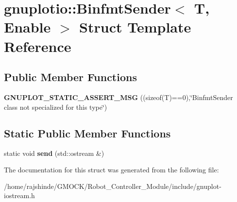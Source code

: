 \hypertarget{structgnuplotio_1_1_binfmt_sender}{}\section{gnuplotio\+:\+:Binfmt\+Sender$<$ T, Enable $>$ Struct Template Reference}
\label{structgnuplotio_1_1_binfmt_sender}
\subsection*{Public Member Functions}
\begin{DoxyCompactItemize}
\item 
{\bfseries G\+N\+U\+P\+L\+O\+T\+\_\+\+S\+T\+A\+T\+I\+C\+\_\+\+A\+S\+S\+E\+R\+T\+\_\+\+M\+SG} ((sizeof(T)==0),\char`\"{}Binfmt\+Sender class not specialized for this type\char`\"{})\hypertarget{structgnuplotio_1_1_binfmt_sender_ab0b554a2e81309917b2fa6f480e2a8e2}{}\label{structgnuplotio_1_1_binfmt_sender_ab0b554a2e81309917b2fa6f480e2a8e2}

\end{DoxyCompactItemize}
\subsection*{Static Public Member Functions}
\begin{DoxyCompactItemize}
\item 
static void {\bfseries send} (std\+::ostream \&)\hypertarget{structgnuplotio_1_1_binfmt_sender_a762010e3172c02e981252f93185b29c8}{}\label{structgnuplotio_1_1_binfmt_sender_a762010e3172c02e981252f93185b29c8}

\end{DoxyCompactItemize}


The documentation for this struct was generated from the following file\+:\begin{DoxyCompactItemize}
\item 
/home/rajshinde/\+G\+M\+O\+C\+K/\+Robot\+\_\+\+Controller\+\_\+\+Module/include/gnuplot-\/iostream.\+h\end{DoxyCompactItemize}
